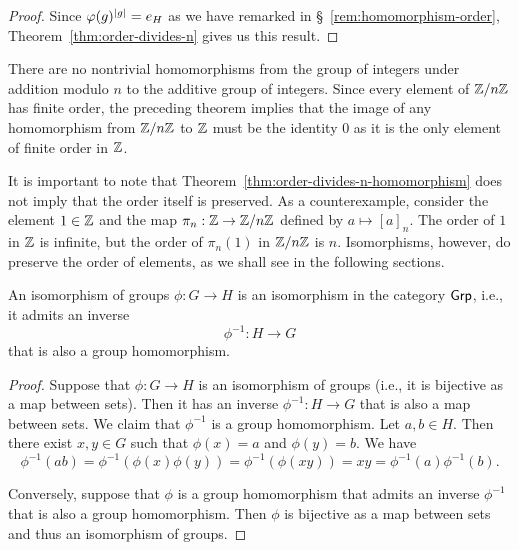 \begin{proof}
    Since \(\varphi(g)^{\lvert g \rvert} = e_H\) as we have remarked in
    \S~\ref{rem:homomorphism-order}, Theorem~\ref{thm:order-divides-n} gives us
    this result.
\end{proof}

\begin{example}
    There are no nontrivial homomorphisms from the group of integers under
    addition modulo \(n\) to the additive group of integers. Since every element
    of \(\mathbb{Z}/n\mathbb{Z}\) has finite order, the preceding theorem implies that the image
    of any homomorphism from \(\mathbb{Z}/n\mathbb{Z}\) to \(\mathbb{Z}\) must be the identity \(0\) as
    it is the only element of finite order in \(\mathbb{Z}\).
\end{example}

\begin{example}
    It is important to note that Theorem~\ref{thm:order-divides-n-homomorphism}
    does not imply that the order itself is preserved. As a counterexample,
    consider the element \(1 \in \mathbb{Z}\) and the map \(\pi_n : \mathbb{Z} \to \mathbb{Z}/n\mathbb{Z}\)
    defined by \(a \mapsto [a]_n\). The order of \(1\) in \(\mathbb{Z}\) is infinite,
    but the order of \(\pi_n(1)\) in \(\mathbb{Z}/n\mathbb{Z}\) is \(n\). Isomorphisms, however,
    do preserve the order of elements, as we shall see in the following
    sections.
\end{example}

\begin{theorem}
    An isomorphism of groups \(\phi: G \to H\) is an isomorphism in the category
    \(\mathsf{Grp}\), i.e., it admits an inverse
    \[
        \phi^{-1}: H \to G
    \]
    that is also a group homomorphism.
\end{theorem}

\begin{proof}
    Suppose that \(\phi: G \to H\) is an isomorphism of groups (i.e., it is
    bijective as a map between sets). Then it has an inverse \(\phi^{-1}: H \to
    G\) that is also a map between sets. We claim that \(\phi^{-1}\) is a group
    homomorphism. Let \(a, b \in H\). Then there exist \(x, y \in G\) such that
    \(\phi(x) = a\) and \(\phi(y) = b\). We have
    \[
        \phi^{-1}(ab) = \phi^{-1}(\phi(x)\phi(y)) = \phi^{-1}(\phi(xy)) = xy = \phi^{-1}(a)\phi^{-1}(b).
    \]
    
    Conversely, suppose that \(\phi\) is a group homomorphism that admits an
    inverse \(\phi^{-1}\) that is also a group homomorphism. Then \(\phi\) is
    bijective as a map between sets and thus an isomorphism of groups.
\end{proof}


